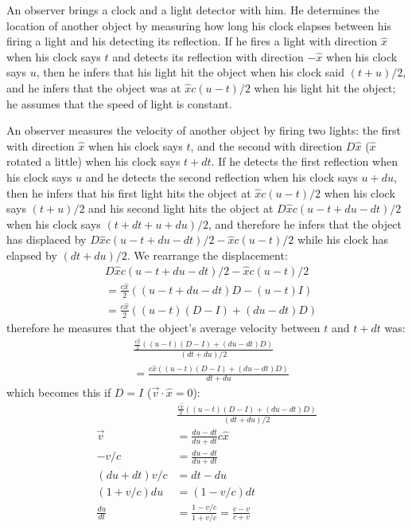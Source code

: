 An observer brings a clock and a light detector with him.
He determines the location
of another object by measuring how long his clock elapses
between his firing a light and his detecting its reflection.
If he fires a light with direction $\hat{x}$
when his clock says $t$ and
detects its reflection with direction $-\hat{x}$ when his clock says $u$,
then he infers that his light hit the object when his clock said $(t+u)/2$,
and he infers that the object was at $\hat{x} c(u-t)/2$ when his light hit the object;
he assumes that the speed of light is constant.

An observer measures the velocity of another object by firing two lights:
the first with direction $\hat{x}$ when his clock says $t$,
and the second with direction $D\hat{x}$ ($\hat{x}$ rotated a little) when his clock says $t + dt$.
If he detects the first reflection when his clock says $u$
and he detects the second reflection when his clock says $u + du$,
then he infers that his first light hits the object at $\hat{x} c(u-t)/2$ when his clock says $(t+u)/2$
and his second light hits the object at $D\hat{x} c(u-t+du-dt)/2$ when his clock says $(t+dt+u+du)/2$,
and therefore he infers that the object has displaced by
$D\hat{x} c(u-t+du-dt)/2 - \hat{x} c(u-t)/2$
while his clock has elapsed by $(dt+du)/2$.
We rearrange the displacement:
\begin{align*}
& D\hat{x} c(u-t+du-dt)/2 - \hat{x} c(u-t)/2
\\ &= \frac{c\hat{x}}{2} ((u-t+du-dt)D - (u-t)I)
\\ &= \frac{c\hat{x}}{2} ((u-t)(D-I) + (du-dt)D)
\end{align*}
therefore he measures that the object's average velocity between $t$ and $t+dt$ was:
\begin{align*}
&\frac{\frac{c\hat{x}}{2} ((u-t)(D-I) + (du-dt)D)}{(dt+du)/2}
\\ &= \frac{c\hat{x} ((u-t)(D-I) + (du-dt)D)}{dt+du}
\end{align*}
which becomes this if $D=I$ ($\vec{v} \cdot \hat{x} = 0$):
\begin{align*}
&\frac{\frac{c\hat{x}}{2} ((u-t)(D-I) + (du-dt)D)}{(dt+du)/2}
\\ \vec{v} &= \frac{du-dt}{du+dt} c \hat{x}
\\ -v/c &= \frac{du-dt}{du+dt}
\\ (du+dt) v/c &= dt-du
\\ (1+v/c)du &= (1-v/c)dt
\\ \frac{du}{dt} &= \frac{1-v/c}{1+v/c} = \frac{c-v}{c+v}
\end{align*}

